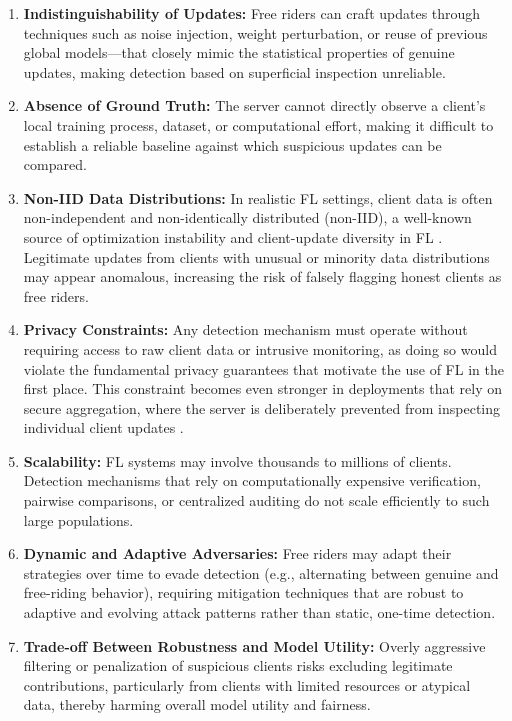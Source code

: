 \begin{enumerate}
    \item \textbf{Indistinguishability of Updates:} Free riders can craft updates through techniques such as noise injection, weight perturbation, or reuse of previous global models—that closely mimic the statistical properties of genuine updates, making detection based on superficial inspection unreliable.

    \item \textbf{Absence of Ground Truth:} The server cannot directly observe a client's local training process, dataset, or computational effort, making it difficult to establish a reliable baseline against which suspicious updates can be compared.

    \item \textbf{Non-IID Data Distributions:} In realistic FL settings, client data is often non-independent and non-identically distributed (non-IID), a well-known source of optimization instability and client-update diversity in FL \cite{zhao2018federated,kairouz2021advances}. Legitimate updates from clients with unusual or minority data distributions may appear anomalous, increasing the risk of falsely flagging honest clients as free riders.

    \item \textbf{Privacy Constraints:} Any detection mechanism must operate without requiring access to raw client data or intrusive monitoring, as doing so would violate the fundamental privacy guarantees that motivate the use of FL in the first place. This constraint becomes even stronger in deployments that rely on secure aggregation, where the server is deliberately prevented from inspecting individual client updates \cite{bonawitz2017practical}.

    \item \textbf{Scalability:} FL systems may involve thousands to millions of clients. Detection mechanisms that rely on computationally expensive verification, pairwise comparisons, or centralized auditing do not scale efficiently to such large populations.

    \item \textbf{Dynamic and Adaptive Adversaries:} Free riders may adapt their strategies over time to evade detection (e.g., alternating between genuine and free-riding behavior), requiring mitigation techniques that are robust to adaptive and evolving attack patterns rather than static, one-time detection.

    \item \textbf{Trade-off Between Robustness and Model Utility:} Overly aggressive filtering or penalization of suspicious clients risks excluding legitimate contributions, particularly from clients with limited resources or atypical data, thereby harming overall model utility and fairness.
\end{enumerate}

